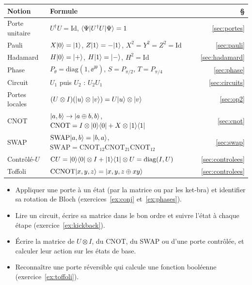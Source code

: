 \begin{center}
\renewcommand{\arraystretch}{1.45}
\begin{tabular}{@{}l l r@{}}
\toprule
\textbf{Notion} & \textbf{Formule} & \textbf{§} \\
\midrule
Porte unitaire & $U^\dagger U=\mathrm{Id}$, \quad $\langle \Psi|U^\dagger U|\Psi\rangle=1$ & \ref{sec:portes} \\
Pauli & $X|0\rangle=|1\rangle$, \quad $Z|1\rangle=-|1\rangle$, \quad $X^2=Y^2=Z^2=\mathrm{Id}$ & \ref{sec:pauli} \\
Hadamard & $H|0\rangle=|+\rangle$, \quad $H|1\rangle=|-\rangle$, \quad $H^2=\mathrm{Id}$ & \ref{sec:hadamard} \\
Phase & $P_\theta=\mathrm{diag}(1,\ee^{\ii\theta})$, \quad $S=P_{\pi/2}$, \quad $T=P_{\pi/4}$ & \ref{sec:phase} \\
Circuit & $U_1$ puis $U_2$ : \quad $U_2U_1$ & \ref{sec:circuits} \\
Portes locales & $(U\otimes I)(|u\rangle\otimes|v\rangle)=U|u\rangle\otimes|v\rangle$ & \ref{sec:op2} \\
CNOT & $|a,b\rangle\to|a\oplus b,b\rangle$, \quad $\mathrm{CNOT}=I\otimes|0\rangle\langle 0|+X\otimes|1\rangle\langle 1|$
  & \ref{sec:cnot} \\
SWAP & $\mathrm{SWAP}|a,b\rangle=|b,a\rangle$, \quad $\mathrm{SWAP}=\mathrm{CNOT}_{12}\mathrm{CNOT}_{21}\mathrm{CNOT}_{12}$
  & \ref{sec:swap} \\
Contrôlé-$U$ & $\mathrm{C}U=|0\rangle\langle 0|\otimes I+|1\rangle\langle 1|\otimes U=\mathrm{diag}(I,U)$ & \ref{sec:controlees} \\
Toffoli & $\mathrm{CCNOT}|x,y,z\rangle=|x,y,z\oplus xy\rangle$ & \ref{sec:controlees} \\
\bottomrule
\end{tabular}
\end{center}

\begin{savoirfaire}
\begin{itemize}
  \item Appliquer une porte à un état (par la matrice ou par les ket-bra) et identifier sa rotation
        de Bloch (exercices~\ref{ex:conj} et~\ref{ex:phases}).
  \item Lire un circuit, écrire sa matrice dans le bon ordre et suivre l'état à chaque étape
        (exercice~\ref{ex:kickback}).
  \item Écrire la matrice de $U\otimes I$, du CNOT, du SWAP ou d'une porte contrôlée, et calculer
        leur action sur les états de base.
  \item Reconnaître une porte réversible qui calcule une fonction booléenne
        (exercice~\ref{ex:toffoli}).
\end{itemize}
\end{savoirfaire}
